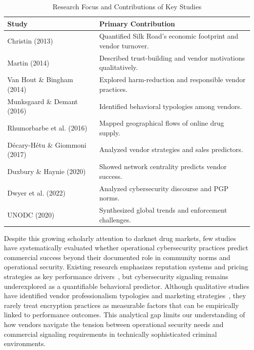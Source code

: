 \documentclass{article}
\begin{document}
\begin{table}[ht]
\scriptsize
\centering
\begin{tabular}{@{}p{4cm} p{7cm}@{}}
\toprule
\textbf{Study}                                     & \textbf{Primary Contribution}                                                    \\
\midrule
Christin (2013)~\cite{christin2013}               & Quantified Silk Road's economic footprint and vendor turnover.                 \\
Martin (2014)~\cite{martin2014}                   & Described trust-building and vendor motivations qualitatively.                 \\
Van Hout \& Bingham (2014)~\cite{vanhout2014}     & Explored harm-reduction and responsible vendor practices.                     \\
Munksgaard \& Demant (2016)~\cite{munksgaard2016} & Identified behavioral typologies among vendors.                                \\
Rhumorbarbe et al. (2016)~\cite{rhumorbarbe2016}  & Mapped geographical flows of online drug supply.                               \\
Décary-Hétu \& Giommoni (2017)~\cite{decary2017}  & Analyzed vendor strategies and sales predictors.                               \\
Duxbury \& Haynie (2020)~\cite{duxbury2020}       & Showed network centrality predicts vendor success.                            \\
Dwyer et al. (2022)~\cite{dwyer2022}               & Analyzed cybersecurity discourse and PGP norms.                               \\
UNODC (2020)~\cite{unodc2020}                      & Synthesized global trends and enforcement challenges.                         \\
\bottomrule
\end{tabular}
\caption{Research Focus and Contributions of Key Studies}
\label{tab:research-focus}
\end{table}

Despite this growing scholarly attention to darknet drug markets, few studies have systematically evaluated whether operational cybersecurity practices predict commercial success beyond their documented role in community norms and operational security. Existing research emphasizes reputation systems and pricing strategies as key performance drivers~\cite{christin2013, aldridge2016}, but cybersecurity signaling remains underexplored as a quantifiable behavioral predictor. Although qualitative studies have identified vendor professionalism typologies and marketing strategies~\cite{vanhout2014, munksgaard2016}, they rarely treat encryption practices as measurable factors that can be empirically linked to performance outcomes. This analytical gap limits our understanding of how vendors navigate the tension between operational security needs and commercial signaling requirements in technically sophisticated criminal environments.
\end{document}
